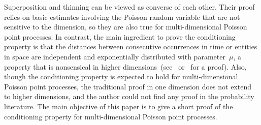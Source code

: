 \documentclass[letterpaper,11pt,twoside,keywordsasfootnote,addressatend,noinfoline]{article}
\begin{document}
 Superposition and thinning can be viewed as converse of each other.
 Their proof relies on basic estimates involving the Poisson random variable that are not sensitive to the dimension, so they are also true for multi-dimensional Poisson point processes.
 In contrast, the main ingredient to prove the conditioning property is that the distances between consecutive occurrences in time or entities in space are independent and exponentially distributed with parameter~$\mu$, a property that is nonsensical in higher dimensions~(see~\cite[Lemma~9.4]{lanchier_2017} or~\cite[Theorem~5.2]{ross_2010} for a proof).
 Also, though the conditioning property is expected to hold for multi-dimensional Poisson point processes, the traditional proof in one dimension does not extend to higher dimensions, and the author could not find any proof in the probability literature.
 The main objective of this paper is to give a short proof of the conditioning property for multi-dimensional Poisson point processes.
 
\end{document}
